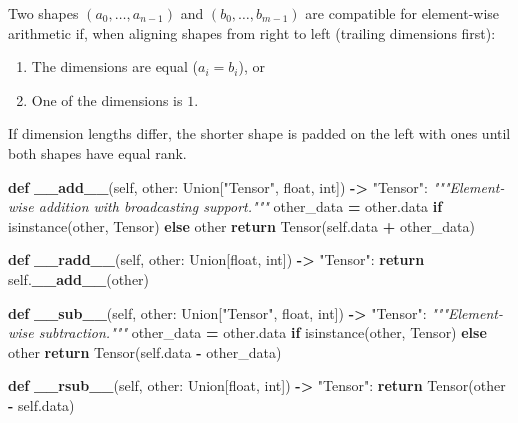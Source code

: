\documentclass[
  letterpaper,
]{scrbook}
\newenvironment{Shaded}{\begin{snugshade}}{\end{snugshade}}
\newcommand{\BuiltInTok}[1]{#1}
\newcommand{\CommentTok}[1]{\textcolor[rgb]{0.56,0.35,0.01}{\textit{#1}}}
\newcommand{\ControlFlowTok}[1]{\textcolor[rgb]{0.13,0.29,0.53}{\textbf{#1}}}
\newcommand{\FunctionTok}[1]{\textcolor[rgb]{0.13,0.29,0.53}{\textbf{#1}}}
\newcommand{\KeywordTok}[1]{\textcolor[rgb]{0.13,0.29,0.53}{\textbf{#1}}}
\newcommand{\NormalTok}[1]{#1}
\newcommand{\OperatorTok}[1]{\textcolor[rgb]{0.81,0.36,0.00}{\textbf{#1}}}
\newcommand{\StringTok}[1]{\textcolor[rgb]{0.31,0.60,0.02}{#1}}
\newcommand{\VariableTok}[1]{\textcolor[rgb]{0.00,0.00,0.00}{#1}}
\providecommand{\tightlist}{%
  \setlength{\itemsep}{0pt}\setlength{\parskip}{0pt}}
\begin{document}
Two shapes \((a_0, \dots, a_{n-1})\) and \((b_0, \dots, b_{m-1})\) are
compatible for element-wise arithmetic if, when aligning shapes from
right to left (trailing dimensions first):

\begin{enumerate}
\def\labelenumi{\arabic{enumi}.}
\tightlist
\item
  The dimensions are equal (\(a_i = b_i\)), or
\item
  One of the dimensions is \(1\).
\end{enumerate}

If dimension lengths differ, the shorter shape is padded on the left
with ones until both shapes have equal rank.

\begin{Shaded}
\begin{Highlighting}[]
\KeywordTok{def} \FunctionTok{\_\_add\_\_}\NormalTok{(}\VariableTok{self}\NormalTok{, other: Union[}\StringTok{"Tensor"}\NormalTok{, }\BuiltInTok{float}\NormalTok{, }\BuiltInTok{int}\NormalTok{]) }\OperatorTok{{-}\textgreater{}} \StringTok{"Tensor"}\NormalTok{:}
    \CommentTok{"""Element{-}wise addition with broadcasting support."""}
\NormalTok{    other\_data }\OperatorTok{=}\NormalTok{ other.data }\ControlFlowTok{if} \BuiltInTok{isinstance}\NormalTok{(other, Tensor) }\ControlFlowTok{else}\NormalTok{ other}
    \ControlFlowTok{return}\NormalTok{ Tensor(}\VariableTok{self}\NormalTok{.data }\OperatorTok{+}\NormalTok{ other\_data)}

\KeywordTok{def} \FunctionTok{\_\_radd\_\_}\NormalTok{(}\VariableTok{self}\NormalTok{, other: Union[}\BuiltInTok{float}\NormalTok{, }\BuiltInTok{int}\NormalTok{]) }\OperatorTok{{-}\textgreater{}} \StringTok{"Tensor"}\NormalTok{:}
    \ControlFlowTok{return} \VariableTok{self}\NormalTok{.}\FunctionTok{\_\_add\_\_}\NormalTok{(other)}

\KeywordTok{def} \FunctionTok{\_\_sub\_\_}\NormalTok{(}\VariableTok{self}\NormalTok{, other: Union[}\StringTok{"Tensor"}\NormalTok{, }\BuiltInTok{float}\NormalTok{, }\BuiltInTok{int}\NormalTok{]) }\OperatorTok{{-}\textgreater{}} \StringTok{"Tensor"}\NormalTok{:}
    \CommentTok{"""Element{-}wise subtraction."""}
\NormalTok{    other\_data }\OperatorTok{=}\NormalTok{ other.data }\ControlFlowTok{if} \BuiltInTok{isinstance}\NormalTok{(other, Tensor) }\ControlFlowTok{else}\NormalTok{ other}
    \ControlFlowTok{return}\NormalTok{ Tensor(}\VariableTok{self}\NormalTok{.data }\OperatorTok{{-}}\NormalTok{ other\_data)}

\KeywordTok{def} \FunctionTok{\_\_rsub\_\_}\NormalTok{(}\VariableTok{self}\NormalTok{, other: Union[}\BuiltInTok{float}\NormalTok{, }\BuiltInTok{int}\NormalTok{]) }\OperatorTok{{-}\textgreater{}} \StringTok{"Tensor"}\NormalTok{:}
    \ControlFlowTok{return}\NormalTok{ Tensor(other }\OperatorTok{{-}} \VariableTok{self}\NormalTok{.data)}


\end{Highlighting}
\end{Shaded}
\end{document}
